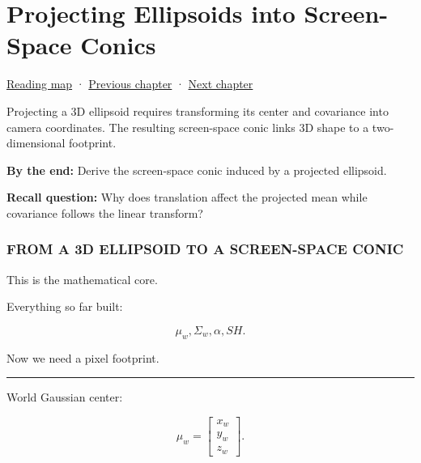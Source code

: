\chapter{Projecting Ellipsoids into Screen-Space Conics}\label{04-visual-computing-ii-ch038-projecting-ellipsoids-into-screen-space-conics}\hypertarget{04-visual-computing-ii-ch038}{}\label{stagechapter:04-visual-computing-ii-ch038}

\hypertarget{04-visual-computing-ii-ch038-projecting-ellipsoids-into-screen-space-conics}{}

\hyperref[volume-reading-map]{Reading map} · \hyperref[04-visual-computing-ii-ch037-gaussian-splatting-and-editable-captured-worlds]{Previous chapter} · \hyperref[04-visual-computing-ii-ch039-tiling-ordering-and-compositing-at-scale]{Next chapter}

Projecting a 3D ellipsoid requires transforming its center and covariance into camera coordinates. The resulting screen-space conic links 3D shape to a two-dimensional footprint.

\textbf{By the end:} Derive the screen-space conic induced by a projected ellipsoid.

\textbf{Recall question:} Why does translation affect the projected mean while covariance follows the linear transform?

\subsection{FROM A 3D ELLIPSOID TO A SCREEN-SPACE CONIC}\label{04-visual-computing-ii-ch038-from-a-3d-ellipsoid-to-a-screen-space-conic}

\hypertarget{04-visual-computing-ii-ch038-from-a-3d-ellipsoid-to-a-screen-space-conic}{}

This is the mathematical core.

Everything so far built:

\[
\mu_w,
\Sigma_w,
\alpha,
SH.
\]

Now we need a pixel footprint.

\begin{center}\rule{0.5\linewidth}{0.5pt}\end{center}

World Gaussian center:

\[
\mu_w=
\begin{bmatrix}
x_w\\y_w\\z_w
\end{bmatrix}.
\]

